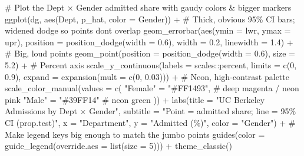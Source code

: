 \documentclass[
  letterpaper,
  DIV=11,
  numbers=noendperiod]{scrreprt}
\newenvironment{Shaded}{\begin{snugshade}}{\end{snugshade}}
\newcommand{\AttributeTok}[1]{\textcolor[rgb]{0.40,0.45,0.13}{#1}}
\newcommand{\CommentTok}[1]{\textcolor[rgb]{0.37,0.37,0.37}{#1}}
\newcommand{\DecValTok}[1]{\textcolor[rgb]{0.68,0.00,0.00}{#1}}
\newcommand{\FloatTok}[1]{\textcolor[rgb]{0.68,0.00,0.00}{#1}}
\newcommand{\FunctionTok}[1]{\textcolor[rgb]{0.28,0.35,0.67}{#1}}
\newcommand{\NormalTok}[1]{\textcolor[rgb]{0.00,0.23,0.31}{#1}}
\newcommand{\OtherTok}[1]{\textcolor[rgb]{0.00,0.23,0.31}{#1}}
\newcommand{\SpecialCharTok}[1]{\textcolor[rgb]{0.37,0.37,0.37}{#1}}
\newcommand{\StringTok}[1]{\textcolor[rgb]{0.13,0.47,0.30}{#1}}
\begin{document}
\begin{Shaded}
\begin{Highlighting}[]
\CommentTok{\# Plot the Dept × Gender admitted share with gaudy colors \& bigger markers}
\FunctionTok{ggplot}\NormalTok{(dg, }\FunctionTok{aes}\NormalTok{(Dept, p\_hat, }\AttributeTok{color =}\NormalTok{ Gender)) }\SpecialCharTok{+}
  \CommentTok{\# Thick, obvious 95\% CI bars; widened dodge so points don\textquotesingle{}t overlap}
  \FunctionTok{geom\_errorbar}\NormalTok{(}\FunctionTok{aes}\NormalTok{(}\AttributeTok{ymin =}\NormalTok{ lwr, }\AttributeTok{ymax =}\NormalTok{ upr),}
                \AttributeTok{position =} \FunctionTok{position\_dodge}\NormalTok{(}\AttributeTok{width =} \FloatTok{0.6}\NormalTok{),}
                \AttributeTok{width =} \FloatTok{0.2}\NormalTok{, }\AttributeTok{linewidth =} \FloatTok{1.4}\NormalTok{) }\SpecialCharTok{+}
  \CommentTok{\# Big, loud points}
  \FunctionTok{geom\_point}\NormalTok{(}\AttributeTok{position =} \FunctionTok{position\_dodge}\NormalTok{(}\AttributeTok{width =} \FloatTok{0.6}\NormalTok{),}
             \AttributeTok{size =} \FloatTok{5.2}\NormalTok{) }\SpecialCharTok{+}
  \CommentTok{\# Percent axis}
  \FunctionTok{scale\_y\_continuous}\NormalTok{(}\AttributeTok{labels =}\NormalTok{ scales}\SpecialCharTok{::}\NormalTok{percent, }\AttributeTok{limits =} \FunctionTok{c}\NormalTok{(}\DecValTok{0}\NormalTok{, }\FloatTok{0.9}\NormalTok{),}
                     \AttributeTok{expand =} \FunctionTok{expansion}\NormalTok{(}\AttributeTok{mult =} \FunctionTok{c}\NormalTok{(}\DecValTok{0}\NormalTok{, }\FloatTok{0.03}\NormalTok{))) }\SpecialCharTok{+}
  \CommentTok{\# Neon, high{-}contrast palette}
  \FunctionTok{scale\_color\_manual}\NormalTok{(}\AttributeTok{values =} \FunctionTok{c}\NormalTok{(}
    \StringTok{"Female"} \OtherTok{=} \StringTok{"\#FF1493"}\NormalTok{,  }\CommentTok{\# deep magenta / neon pink}
    \StringTok{"Male"}   \OtherTok{=} \StringTok{"\#39FF14"}   \CommentTok{\# neon green}
\NormalTok{  )) }\SpecialCharTok{+}
  \FunctionTok{labs}\NormalTok{(}\AttributeTok{title =} \StringTok{"UC Berkeley Admissions by Dept × Gender"}\NormalTok{,}
       \AttributeTok{subtitle =} \StringTok{"Point = admitted share; line = 95\% CI (prop.test)"}\NormalTok{,}
       \AttributeTok{x =} \StringTok{"Department"}\NormalTok{, }\AttributeTok{y =} \StringTok{"Admitted (\%)"}\NormalTok{, }\AttributeTok{color =} \StringTok{"Gender"}\NormalTok{) }\SpecialCharTok{+}
  \CommentTok{\# Make legend keys big enough to match the jumbo points}
  \FunctionTok{guides}\NormalTok{(}\AttributeTok{color =} \FunctionTok{guide\_legend}\NormalTok{(}\AttributeTok{override.aes =} \FunctionTok{list}\NormalTok{(}\AttributeTok{size =} \DecValTok{5}\NormalTok{)))  }\SpecialCharTok{+} \FunctionTok{theme\_classic}\NormalTok{()}
\end{Highlighting}
\end{Shaded}
\end{document}
